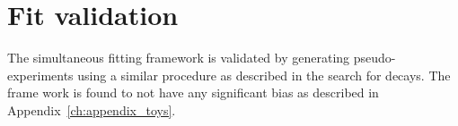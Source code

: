 

\section{Fit validation}
\label{sec:B2DsPhi_fitstrategy}
The simultaneous fitting framework is validated by generating pseudo-experiments using a similar procedure as described in the search for \decay{\Bp}{\Dsp\Kp\Km} decays. The frame work is found to not have any significant bias as described in Appendix~\ref{ch:appendix_toys}.


